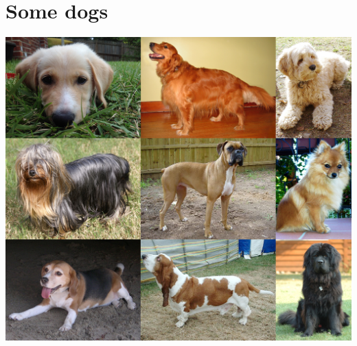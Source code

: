\documentclass[12pt]{article}
\begin{document}
\section{Some dogs}

\includegraphics[scale=0.2]{Collage_of_Nine_Dogs}
\end{document}
